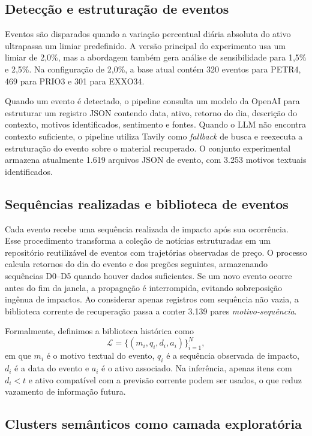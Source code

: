 \documentclass[conference]{IEEEtran}
\begin{document}
\subsection{Detecção e estruturação de eventos}

Eventos são disparados quando a variação percentual diária absoluta do ativo ultrapassa um limiar predefinido. A versão principal do experimento usa um limiar de 2,0\%, mas a abordagem também gera análise de sensibilidade para 1,5\% e 2,5\%. Na configuração de 2,0\%, a base atual contém 320 eventos para PETR4, 469 para PRIO3 e 301 para EXXO34.

Quando um evento é detectado, o pipeline consulta um modelo da OpenAI para estruturar um registro JSON contendo data, ativo, retorno do dia, descrição do contexto, motivos identificados, sentimento e fontes. Quando o LLM não encontra contexto suficiente, o pipeline utiliza Tavily como \textit{fallback} de busca e reexecuta a estruturação do evento sobre o material recuperado. O conjunto experimental armazena atualmente 1.619 arquivos JSON de evento, com 3.253 motivos textuais identificados.

\subsection{Sequências realizadas e biblioteca de eventos}

Cada evento recebe uma sequência realizada de impacto após sua ocorrência. Esse procedimento transforma a coleção de notícias estruturadas em um repositório reutilizável de eventos com trajetórias observadas de preço. O processo calcula retornos do dia do evento e dos pregões seguintes, armazenando sequências D0--D5 quando houver dados suficientes. Se um novo evento ocorre antes do fim da janela, a propagação é interrompida, evitando sobreposição ingênua de impactos. Ao considerar apenas registros com sequência não vazia, a biblioteca corrente de recuperação passa a conter 3.139 pares \textit{motivo-sequência}.

Formalmente, definimos a biblioteca histórica como
\[
\mathcal{L} = \{(m_i, q_i, d_i, a_i)\}_{i=1}^{N},
\]
em que $m_i$ é o motivo textual do evento, $q_i$ é a sequência observada de impacto, $d_i$ é a data do evento e $a_i$ é o ativo associado. Na inferência, apenas itens com $d_i < t$ e ativo compatível com a previsão corrente podem ser usados, o que reduz vazamento de informação futura.

\subsection{Clusters semânticos como camada exploratória}
\end{document}
